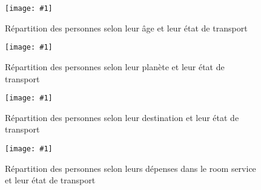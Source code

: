 \documentclass[a4paper]{article}
\newcommand{\illustration}[3]{
    \begin{figure}[h!]
        \centering
        \texttt{[image: \#1]}
        \caption{#2}
    \end{figure}
}
\begin{document}
    \illustration{images/Figure 3.png}{Répartition des personnes selon leur âge et leur état de transport}{8cm}
    
    \illustration{images/Figure 4.png}{Répartition des personnes selon leur planète et leur état de transport}{8cm}
    
    \illustration{images/Figure 5.png}{Répartition des personnes selon leur destination et leur état de transport}{8cm}
    
    \illustration{images/Figure 6.png}{Répartition des personnes selon leurs dépenses dans le room service et leur état de transport}{8cm}
\end{document}
